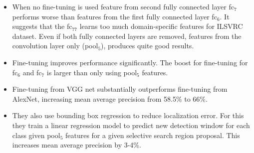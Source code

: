 \documentclass{article}
\begin{document}
\begin{itemize}
    \item When no fine-tuning is used feature from second fully connected layer fc$_7$ performs worse than features from the first fully connected layer fc$_6$. It suggests that the fc$_77$ learns too much domain-specific features for ILSVRC dataset. Even if both fully connected layers are removed, features from the convolution layer only (pool$_5$), produces quite good results.
    \item Fine-tuning improves performance significantly. The boost for fine-tuning for fc$_6$ and fc$_7$ is larger than only using pool$_5$ features. 
    \item Fine-tuning from VGG net substantially outperforms fine-tuning from AlexNet, increasing mean average precision from 58.5\% to 66\%. 
    \item They also use bounding box regression to reduce localization error. For this they train a linear regression model to predict new detection window for each class given pool$_5$ features for a given selective search region proposal. This increases mean average precision by 3-4\%.
    
\end{itemize}
\end{document}
